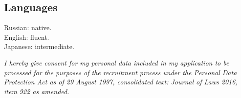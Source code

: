 \documentclass[margin,line]{CV}
\def\consentclause{}
\begin{document}
\begin{resume}
    \section{\mysidestyle Languages}
    Russian: native. \\
    English: fluent. \\
    Japanese: intermediate.
  
    \ifdefined\consentclause
    \vspace{5mm}
    {\footnotesize\textit{I hereby give consent for my personal data included in my application to be processed for the purposes of the recruitment process under the Personal Data Protection Act as of 29 August 1997, consolidated text: Journal of Laws 2016, item 922 as amended.}}
    \fi
    
    
\end{resume}
\end{document}
